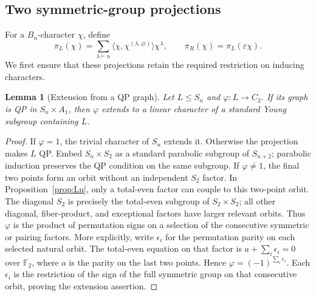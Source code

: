 \documentclass[11pt]{article}
\numberwithin{equation}{section}
\newtheorem{lemma}[theorem]{Lemma}
\theoremstyle{definition}
\newcommand{\F}{\mathbb F}
\newcommand{\ee}{\varepsilon}
\newcommand{\emptypar}{\varnothing}
\begin{document}
\subsection{Two symmetric-group projections}

For a \(B_n\)-character \(\chi\), define
\[
 \pi_L(\chi)=\sum_{\lambda\vdash n}
       \langle\chi,\chi^{(\lambda,\emptypar)}\rangle\chi^\lambda,
 \qquad \pi_R(\chi)=\pi_L(\ee\chi).
\]
We first ensure that these projections retain the required restriction on inducing characters.

\begin{lemma}[Extension from a QP graph]\label{lem:graphextend}
Let \(L\leq S_n\) and \(\varphi:L\to C_2\).
If its graph is QP in \(S_n\times A_1\), then \(\varphi\) extends to a linear character of a standard Young subgroup containing \(L\).
\end{lemma}
\begin{proof}
If \(\varphi=1\), the trivial character of \(S_n\) extends it.
Otherwise the projection makes \(L\) QP.
Embed \(S_n\times S_2\) as a standard parabolic subgroup of \(S_{n+2}\); parabolic induction preserves the QP condition on the same subgroup.
If \(\varphi\ne1\), the final two points form an orbit without an independent \(S_2\) factor.
In Proposition~\ref{prop:Lu}, only a total-even factor can couple to this two-point orbit.
The diagonal \(S_2\) is precisely the total-even subgroup of \(S_2\times S_2\); all other diagonal, fiber-product, and exceptional factors have larger relevant orbits.
Thus \(\varphi\) is the product of permutation signs on a selection of the consecutive symmetric or pairing factors.
More explicitly, write \(\epsilon_i\) for the permutation parity on each selected natural orbit.
The total-even equation on that factor is \(a+\sum_i\epsilon_i=0\) over \(\F_2\), where \(a\) is the parity on the last two points.
Hence \(\varphi=(-1)^{\sum_i\epsilon_i}\).
Each \(\epsilon_i\) is the restriction of the sign of the full symmetric group on that consecutive orbit, proving the extension assertion.
\end{proof}
\end{document}

